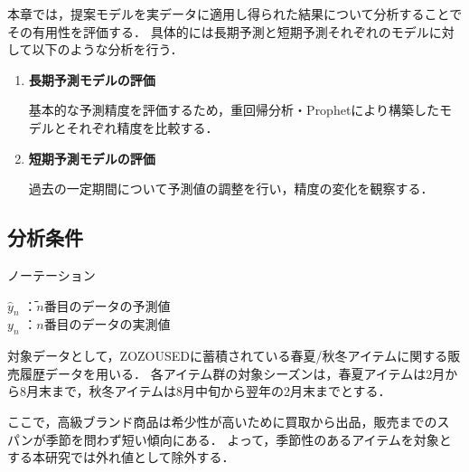 \documentclass[dvipdfmx]{jreport}
\begin{document}
本章では，提案モデルを実データに適用し得られた結果について分析することでその有用性を評価する．
具体的には長期予測と短期予測それぞれのモデルに対して以下のような分析を行う．
\begin{tcolorbox}[title=\textbf{分析方法}]
    \begin{enumerate}
        \item \textbf{長期予測モデルの評価} 
            \begin{adjustwidth}{10pt}{}
                \hspace{6.5pt} 基本的な予測精度を評価するため，重回帰分析・Prophetにより構築したモデルとそれぞれ精度を比較する．
            \end{adjustwidth}
        \item \textbf{短期予測モデルの評価}
        \begin{adjustwidth}{10pt}{}
            \hspace{6.5pt} 過去の一定期間について予測値の調整を行い，精度の変化を観察する．
        \end{adjustwidth}
    \end{enumerate}
\end{tcolorbox}

\subsection{分析条件}\label{分析条件}
\begin{itembox}[l]{\large{ノーテーション}}
    \begin{tabbing}
        \hspace{15pt} \raisebox{0.5ex}{\tiny $\bullet$} $\hat{y}_n$ \hspace{2pt}\=：$n$番目のデータの予測値\\[0.5em]
        \hspace{15pt} \raisebox{0.5ex}{\tiny $\bullet$} $y_n$ \>：$n$番目のデータの実測値
    \end{tabbing}
\end{itembox}

対象データとして，ZOZOUSEDに蓄積されている春夏/秋冬アイテムに関する販売履歴データを用いる．
各アイテム群の対象シーズンは，春夏アイテムは2月から8月末まで，秋冬アイテムは8月中旬から翌年の2月末までとする．

ここで，高級ブランド商品は希少性が高いために買取から出品，販売までのスパンが季節を問わず短い傾向にある．
よって，季節性のあるアイテムを対象とする本研究では外れ値として除外する．
\end{document}
